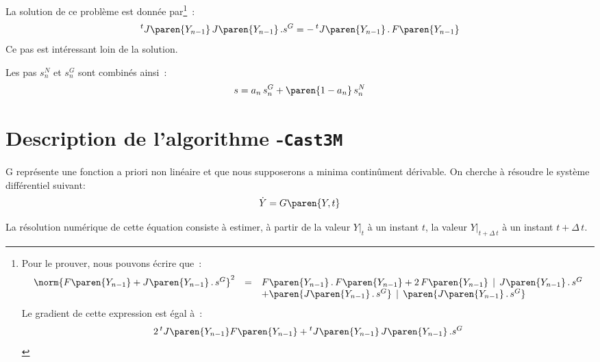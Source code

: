 \documentclass[rectoverso,pleiades,pstricks,leqno,anti]{texmf/note_technique_2010}
\newcommand{\castem}{\texttt{Cast3M}}
\newcommand{\debutpas}[1]{\ensuremath{\left.#1\right|_{t}}}
\newcommand{\finpas}[1]{\ensuremath{\left.#1\right|_{t+\Delta\, t}}}
\begin{document}
La solution de ce problème est donnée par\footnote{Pour le prouver,
  nous pouvons écrire que~:
  \[
  \begin{array}{rcl}
    \norm{F\paren{Y_{n-1}}+J\paren{Y_{n-1}}\,.\,s^{G}}^{2}
    &=& {F}\paren{Y_{n-1}}\,.\,{F}\paren{Y_{n-1}}+2\,F\paren{Y_{n-1}}\,\mid\,J\paren{Y_{n-1}}\,.\,s^{G} \\
    &&+\paren{J\paren{Y_{n-1}}\,.\,s^{G}}\,\mid\,\paren{J\paren{Y_{n-1}}\,.\,s^{G}}
  \end{array}
  \]
  Le gradient de cette expression est égal à~:
  \[
  2\,\mbox{}^{t}J\paren{Y_{n-1}}F\paren{Y_{n-1}}+\mbox{}^{t}J\paren{Y_{n-1}}\,J\paren{Y_{n-1}}\,.s^{G}
  \]
}~:
\[
\mbox{}^{t}J\paren{Y_{n-1}}\,J\paren{Y_{n-1}}\,.s^{G}=-\,\mbox{}^{t}J\paren{Y_{n-1}}\,.\,F\paren{Y_{n-1}}
\]
Ce pas est intéressant loin de la solution.

Les pas \(s^{N}_{n}\) et \(s_{n}^{G}\) sont combinés ainsi~:
\[
s = a_{n} \,s^{G}_{n} + \paren{1-a_{n}}\,s_{n}^{N}
\]

\clearpage
\newpage
\section{Description de l'algorithme -\castem{}}
\label{sec:algoRKcastem}

G représente une fonction a priori non linéaire et que nous supposerons
a minima continûment dérivable. On cherche à résoudre le système
différentiel suivant:
\begin{equation}
  \label{eq:systeme_diff:RK}
  \dot{Y}=G\paren{Y,t}
\end{equation}

La résolution numérique de cette équation consiste à estimer, à partir
de la valeur \(\debutpas{Y}\) à un instant \(t\), la valeur
\(\finpas{Y}\) à un instant \(t+\Delta\, t\).
\end{document}
